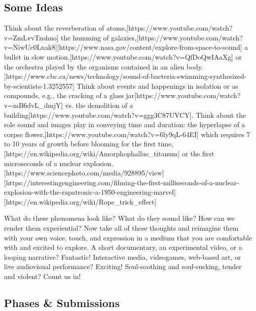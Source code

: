 \hypertarget{projideas}{\subsection{Some Ideas}}

Think about the reverberation of atoms,[https://www.youtube.com/watch?v=ZmLvvTzohno] the humming of galaxies,[https://www.youtube.com/watch?v=NiwUc0Lxak8][https://www.nasa.gov/content/explore-from-space-to-sound] a bullet in slow motion,[https://www.youtube.com/watch?v=QfDoQwIAaXg] or the orchestra played by the organisms contained in an alien body.[https://www.cbc.ca/news/technology/sound-of-bacteria-swimming-synthesized-by-scientists-1.3252557] Think about events and happenings in isolation or as compounds, e.g., the cracking of a glass jar[https://www.youtube.com/watch?v=mB6dvL_dmjY] vs. the demolition of a building[https://www.youtube.com/watch?v=ggg3C87UVCY]. Think about the role sound and images play in conveying time and duration: the hyperlapse of a corpse flower,[https://www.youtube.com/watch?v=6ly9qL-64EI] which requires 7 to 10 years of growth before blooming for the first time,[https://en.wikipedia.org/wiki/Amorphophallus_titanum] or the first microseconds of a nuclear explosion.[https://www.sciencephoto.com/media/928895/view][https://interestingengineering.com/filming-the-first-milliseconds-of-a-nuclear-explosion-with-the-rapatronic-a-1950-engineering-marvel][https://en.wikipedia.org/wiki/Rope_trick_effect]

What do these phenomena look like? What do they sound like? How can we render them experiential? Now take all of these thoughts and reimagine them with your own voice, touch, and expression in a medium that you are comfortable with and excited to explore. A short documentary, an experimental video, or a looping narrative? Fantastic! Interactive media, videogames, web-based art, or live audiovisual performance? Exciting! Soul-soothing and soul-sucking, tender and violent? Count us in!


\hypertarget{projphase}{\subsection{Phases \& Submissions}}

